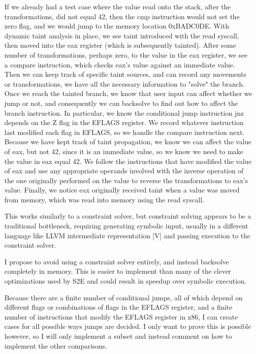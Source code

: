 \documentclass[11pt,expanded,copyright]{fsuthesis}
\begin{document}
If we already had a test case where the value read onto the stack, after the transformations, did not equal 42, then the cmp instruction would not set the zero flag, and we would jump to the memory location 0xBADC0DE. With dynamic taint analysis in place, we see taint introduced with the read syscall, then moved into the eax register (which is subsequently tainted). After some number of transformations, perhaps zero, to the value in the eax register, we see a compare instruction, which checks eax's value against an immediate value. Then we can keep track of specific taint sources, and can record any movements or transformations, we have all the necessary information to "solve" the branch. Once we reach the tainted branch, we know that user input can affect whether we jump or not, and consequently we can backsolve to find out how to affect the branch instruction. In particular, we know the conditional jump instruction jnz depends on the Z flag in the EFLAGS register. We record whatever instruction last modified each flag in EFLAGS, so we handle the compare instruction next. Because we have kept track of taint propagation, we know we can affect the value of eax, but not 42, since it is an immediate value, so we know we need to make the value in eax equal 42. We follow the instructions that have modified the value of eax and use any appropriate operands involved with the inverse operation of the one originally performed on the value to reverse the transformations to eax's value. Finally, we notice eax originally received taint when a value was moved from memory, which was read into memory using the read syscall.

This works similarly to a constraint solver, but constraint solving appears to be a traditional bottleneck, requiring generating symbolic input, usually in a different language like LLVM intermediate representation [V] and passing execution to the constraint solver.

I propose to avoid using a constraint solver entirely, and instead backsolve completely in memory. This is easier to implement than many of the clever optimizations used by S2E and could result in speedup over symbolic execution.

Because there are a finite number of conditional jumps, all of which depend on different flags or combinations of flags in the EFLAGS register, and a finite number of instructions that modify the EFLAGS register in x86, I can create cases for all possible ways jumps are decided. I only want to prove this is possible however, so I will only implement a subset and instead comment on how to implement the other comparisons.
\end{document}
